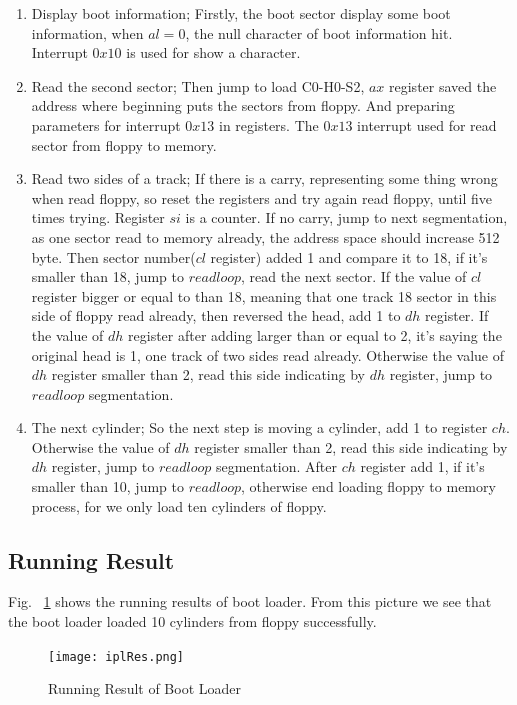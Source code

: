 \documentclass{swfcthesisp}
\begin{document}
\begin{enumerate}
\item Display boot information;
Firstly, the boot sector display some boot information, when $al=0$, the null character of
boot information hit. Interrupt $0x10$ is used for show a character.

\item Read the second sector;
  Then jump to load C0-H0-S2, $ax$ register saved the
address where beginning puts the sectors from floppy. And preparing parameters for
interrupt $0x13$ in registers. The $0x13$ interrupt used for read sector from floppy to
memory.

\item Read two sides of a track;
  If there is a carry, representing some thing wrong when read floppy, so reset the
registers and try again read floppy, until five times trying. Register $si$ is a counter. If
no carry, jump to next segmentation, as one sector read to memory already, the address
space should increase 512 byte. Then sector number($cl$ register) added 1 and compare it to 18, if it's
smaller than 18, jump to $readloop$, read the next sector. If the value of $cl$ register
bigger or equal to than 18, meaning that one track 18 sector in this side of floppy read already, then
reversed the head, add 1 to $dh$ register. If the value of $dh$ register after adding
larger than or equal to 2, it's saying the original head is 1, one track of two sides read
already. Otherwise the value of $dh$ register smaller than 2, read this side indicating by
$dh$ register, jump to $readloop$ segmentation.
\item The next cylinder;
So the next step is moving a cylinder, add 1 to register $ch$. Otherwise the
value of $dh$ register smaller than 2, read this side indicating by $dh$ register, jump to
$readloop$ segmentation. After $ch$ register add 1, if it's smaller than 10, jump to
$readloop$, otherwise end loading floppy to memory process, for we only load ten cylinders
of floppy.
  
  
\end{enumerate}


\subsection{Running Result}
\label{sec:running-result}

Fig. ~\ref{fig:iplRes} shows the running results of boot loader. From this picture we
see that the boot loader loaded 10 cylinders from floppy successfully. 
\begin{figure}[!ht]
  \centering
  \texttt{[image: iplRes.png]}
  \caption{Running Result of Boot Loader}
  \label{fig:iplRes}
\end{figure}
\end{document}
